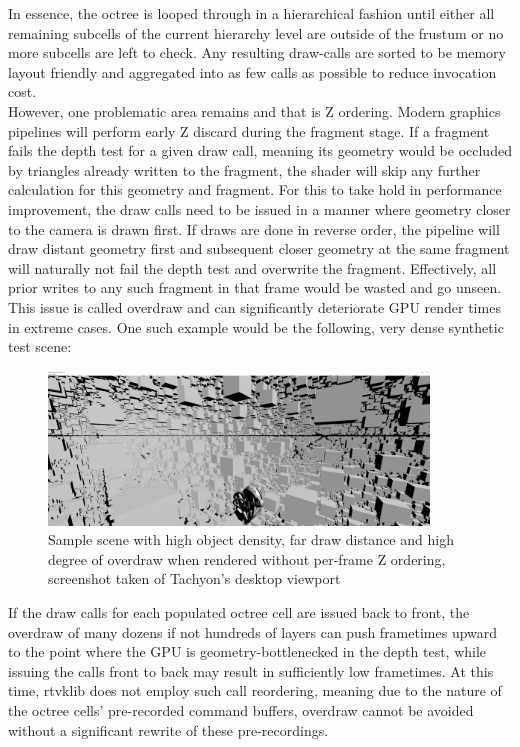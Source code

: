 In essence, the octree is looped through in a hierarchical fashion until either all remaining subcells of the current hierarchy level are outside of the frustum or no more subcells are left to check. Any resulting draw-calls are sorted to be memory layout friendly and aggregated into as few calls as possible to reduce invocation cost. \\

However, one problematic area remains and that is Z ordering. Modern graphics pipelines will perform early Z discard during the fragment stage. If a fragment fails the depth test for a given draw call, meaning its geometry would be occluded by triangles already written to the fragment, the shader will skip any further calculation for this geometry and fragment. For this to take hold in performance improvement, the draw calls need to be issued in a manner where geometry closer to the camera is drawn first. If draws are done in reverse order, the pipeline will draw distant geometry first and subsequent closer geometry at the same fragment will naturally not fail the depth test and overwrite the fragment. Effectively, all prior writes to any such fragment in that frame would be wasted and go unseen. This issue is called overdraw and can significantly deteriorate GPU render times in extreme cases. 
One such example would be the following, very dense synthetic test scene: 

\begin{figure}[htb]
  \centering
  \includegraphics[width=0.9\textwidth]{pictures/scene_chaos}
  \caption{Sample scene with high object density, far draw distance and high degree of overdraw when rendered without per-frame Z ordering, screenshot taken of \gls{Tachyon}'s desktop viewport} \label{fig:scene_chaos}
\end{figure}

If the draw calls for each populated octree cell are issued back to front, the overdraw of many dozens if not hundreds of layers can push frametimes upward to the point where the GPU is geometry-bottlenecked in the depth test, while issuing the calls front to back may result in sufficiently low frametimes.
At this time, rtvklib does not employ such call reordering, meaning due to the nature of the octree cells' pre-recorded command buffers, overdraw cannot be avoided without a significant rewrite of these pre-recordings.

